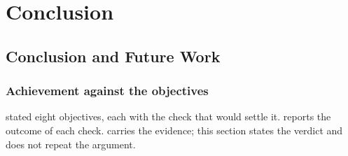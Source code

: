 \chapter{Conclusion}
\label{ch:conclusion}

\section{Conclusion and Future Work}
\label{sec:conclusion}

\subsection*{Achievement against the objectives}

 stated eight objectives, each with the check that would
settle it.  reports the outcome of each check.
 carries the evidence; this section states the verdict and
does not repeat the argument.

